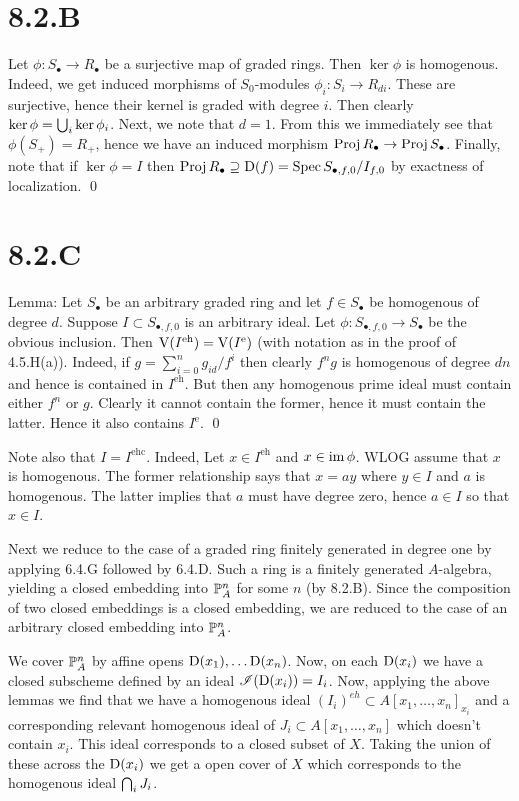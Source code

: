 \documentclass{article}
\begin{document}
\section{8.2.B}
Let $\phi: S_{\bullet} \to R_{\bullet}$ be a surjective map of graded rings. Then
$\ker \phi$ is homogenous. Indeed, we get induced morphisms of
$S_0$-modules $\phi_i: S_i \to R_{di}$. These are surjective,
hence their kernel is graded with degree $i$. Then clearly
$\ker \phi = \Union_i \ker \phi_i$. Next, we note that $d=1$. From this
we immediately see that $\phi(S_+)=R_+$, hence we have an induced
morphism $\Proj R_{\bullet} \to \Proj S_{\bullet}$. Finally, note that if $\ker \phi = I$
then $\Proj R_{\bullet} \supseteq \D(f) = \Spec
    S_{\bullet, f, 0}/I_{f, 0}$ by exactness of localization. \qed

\section{8.2.C}
Lemma: Let $S_{\bullet}$ be an arbitrary graded ring and let
$f \in S_{\bullet}$ be homogenous of degree $d$.
Suppose $I \subset S_{\bullet, f, 0}$ is an arbitrary ideal. Let
$\phi: S_{\bullet, f, 0} \to S_{\bullet}$ be the obvious inclusion. Then $\V(I^{\text{eh}})=\V(I^{\text{e}})$
(with notation as in the proof of 4.5.H(a)). Indeed, if $g=\sum_{i=0}^n g_{id}/f^i$
then clearly $f^ng$ is homogenous of degree
$dn$ and hence is contained in $I^{\text{eh}}$. But
then any homogenous prime ideal must contain either $f^n$ or
$g$. Clearly it cannot contain the former, hence it must
contain the latter. Hence it also contains $I^{\text{e}}$. \qed

Note also that $I = I^{\text{ehc}}$. Indeed, Let $x \in I^{\text{eh}}$ and
$x \in \im \phi$. WLOG assume that $x$ is
homogenous. The former relationship says that $x=ay$ where
$y \in I$ and $a$ is homogenous. The latter
implies that $a$ must have degree zero, hence
$a \in I$ so that $x \in I$.

Next we reduce to the case of a graded ring finitely generated in degree one by
applying 6.4.G followed by 6.4.D. Such a ring is a finitely generated
$A$-algebra, yielding a closed embedding into
$\P^n_A$ for some $n$ (by 8.2.B). Since the
composition of two closed embeddings is a closed embedding, we are reduced to
the case of an arbitrary closed embedding into $\P^n_A$.

We cover $\P^n_A$ by affine opens $\D(x_1), \dots \D(x_n)$. Now,
on each $\D(x_i)$ we have a closed subscheme defined by an ideal
$\Ish(\D(x_i))=I_i$. Now, applying the above lemmas we find that we have a
homogenous ideal $(I_i)^{eh} \subset
    A[x_1, \dots, x_n]_{x_i}$ and a corresponding relevant
homogenous ideal of $J_i \subset A[x_1, \dots, x_n]$ which doesn't contain
$x_i$. This ideal corresponds to a closed subset of
$X$. Taking the union of these across the
$\D(x_i)$ we get a open cover of $X$ which
corresponds to the homogenous ideal $\Intersect_i J_i$.
\end{document}
